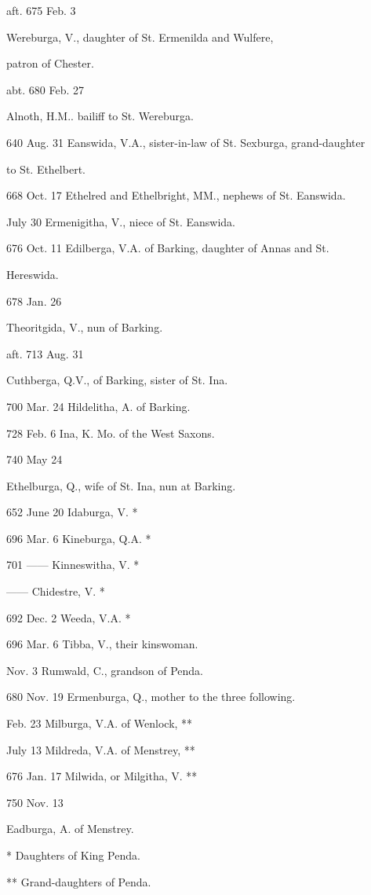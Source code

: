 aft. 675
Feb. 3

Wereburga, V., daughter of St. Ermenilda and Wulfere,

patron of Chester.

abt. 680
Feb. 27

Alnoth, H.M.. bailiff to St. Wereburga.

640
Aug. 31
Eanswida, V.A., sister-in-law of St. Sexburga, grand-daughter

to St. Ethelbert.

668
Oct. 17
Ethelred and Ethelbright, MM., nephews of St. Eanswida.

July 30
Ermenigitha, V., niece of St. Eanswida.

676
Oct. 11
Edilberga, V.A. of Barking, daughter of Annas and St.

Hereswida.

678 Jan. 26

Theoritgida, V., nun of Barking.

aft. 713
Aug. 31

Cuthberga, Q.V., of Barking, sister of St. Ina.

700
Mar. 24
Hildelitha, A. of Barking.

728
Feb. 6
Ina, K. Mo. of the West Saxons.

740
May 24

Ethelburga, Q., wife of St. Ina, nun at Barking.


652 June
20
Idaburga,
V. *

696 Mar.
6
Kineburga, Q.A. *

701 ——
Kinneswitha,
V. *

——
Chidestre, V. *

692 Dec.
2
Weeda, V.A. *

696 Mar.
6
Tibba, V., their kinswoman.

Nov. 3
Rumwald, C., grandson of Penda.

680 Nov.
19
Ermenburga, Q., mother to the three following.

Feb. 23
Milburga,
V.A. of Wenlock, **

July 13
Mildreda,
V.A. of Menstrey, **

676 Jan.
17
Milwida,
or Milgitha, V. **

750 Nov.
13

Eadburga, A. of Menstrey.

* Daughters of King Penda.

** Grand-daughters of Penda.

